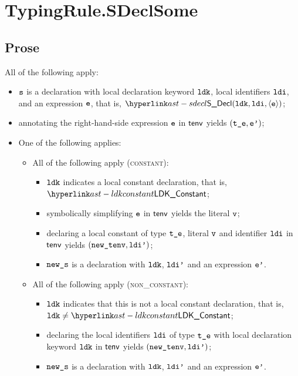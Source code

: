 \section{TypingRule.SDeclSome \label{sec:TypingRule.SDeclSome}}

\subsection{Prose}
All of the following apply:
\begin{itemize}
  \item $\texttt{s}$ is a declaration with local declaration keyword $\texttt{ldk}$, local identifiers $\texttt{ldi}$, and an expression $\texttt{e}$,
        that is, $\SDecl(\ldk, \ldi, \langle\ve\rangle)$;
  \item annotating the right-hand-side expression $\texttt{e}$ in $\textsf{tenv}$ yields $(\texttt{t\_e},\texttt{e'})$\ProseOrTypeError;
  \item One of the following applies:
  \begin{itemize}
    \item All of the following apply (\textsc{constant}):
    \begin{itemize}
      \item $\texttt{ldk}$ indicates a local constant declaration, that is, $\LDKConstant$;
      \item symbolically simplifying $\texttt{e}$ in $\textsf{tenv}$ yields the literal $\texttt{v}$\ProseOrTypeError;
      \item declaring a local constant of type $\texttt{t\_e}$, literal $\texttt{v}$ and identifier $\texttt{ldi}$ in $\textsf{tenv}$ yields $(\texttt{new\_tenv}, \texttt{ldi'})$;
      \item $\texttt{new\_s}$ is a declaration with $\texttt{ldk}$, $\texttt{ldi'}$ and an expression $\texttt{e'}$.
    \end{itemize}

    \item All of the following apply (\textsc{non\_constant}):
    \begin{itemize}
      \item $\texttt{ldk}$ indicates that this is not a local constant declaration, that is, $\ldk\neq\LDKConstant$;
      \item declaring the local identifiers $\texttt{ldi}$ of type $\texttt{t\_e}$ with local declaration keyword $\texttt{ldk}$ in $\textsf{tenv}$
            yields $(\texttt{new\_tenv}, \texttt{ldi'})$;
      \item $\texttt{new\_s}$ is a declaration with $\texttt{ldk}$, $\texttt{ldi'}$ and an expression $\texttt{e'}$.
    \end{itemize}
  \end{itemize}
\end{itemize}

